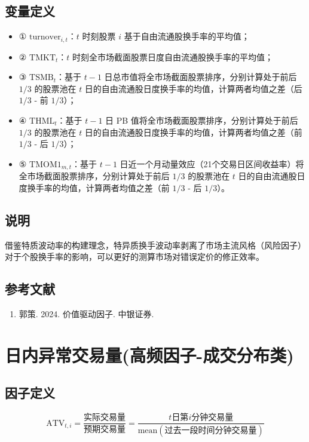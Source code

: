 \documentclass{article}
\begin{document}
\subsection{变量定义}
\begin{itemize}
    \item ① \( \mathrm{turnover}_{i,t} \)：\( t \) 时刻股票 \( i \) 基于自由流通股换手率的平均值；
    \item ② \( \mathrm{TMKT}_t \)：\( t \) 时刻全市场截面股票日度自由流通股换手率的平均值；
    \item ③ \( \mathrm{TSMB}_t \)：基于 \( t-1 \) 日总市值将全市场截面股票排序，分别计算处于前后 \( 1/3 \) 的股票池在 \( t \) 日的自由流通股日度换手率的均值，计算两者均值之差（后 \( 1/3 \) - 前 \( 1/3 \)）；
    \item ④ \( \mathrm{THML}_t \)：基于 \( t-1 \) 日 PB 值将全市场截面股票排序，分别计算处于前后 \( 1/3 \) 的股票池在 \( t \) 日的自由流通股日度换手率的均值，计算两者均值之差（前 \( 1/3 \) - 后 \( 1/3 \)）；
    \item ⑤ \( \mathrm{TMOM1}_{m,t} \)：基于 \( t-1 \) 日近一个月动量效应（21个交易日区间收益率）将全市场截面股票排序，分别计算处于前后 \( 1/3 \) 的股票池在 \( t \) 日的自由流通股日度换手率的均值，计算两者均值之差（前 \( 1/3 \) - 后 \( 1/3 \)）。
\end{itemize}

\subsection{说明}
借鉴特质波动率的构建理念，特异质换手波动率剥离了市场主流风格（风险因子）对于个股换手率的影响，可以更好的测算市场对错误定价的修正效率。

\subsection{参考文献}
\begin{enumerate}
    \item 郭策. 2024. 价值驱动因子. 中银证券.
\end{enumerate}

\section{日内异常交易量(高频因子-成交分布类)}

\subsection{因子定义}
\begin{equation}
    \mathrm{ATV}_{t,i} = \frac{\text{实际交易量}}{\text{预期交易量}} = \frac{t \text{日第} i \text{分钟交易量}}{\mathrm{mean}(\text{过去一段时间分钟交易量})}
\end{equation}
\end{document}
